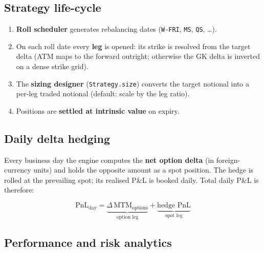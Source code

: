 \documentclass[11pt, a4paper]{article}
\theoremstyle{defstyle}
\newcommand{\code}[1]{\texttt{#1}}
\begin{document}
\subsection{Strategy life-cycle}

\begin{enumerate}
    \item \textbf{Roll scheduler} generates rebalancing dates
          (\code{W-FRI}, \code{MS}, \code{QS}, \ldots).
    \item On each roll date every \textbf{leg} is opened: its strike is resolved from
          the target delta (ATM maps to the forward outright; otherwise the GK delta is
          inverted on a dense strike grid).
    \item The \textbf{sizing designer} (\code{Strategy.size}) converts the target notional
          into a per-leg traded notional (default: scale by the leg ratio).
    \item Positions are \textbf{settled at intrinsic value} on expiry.
\end{enumerate}

\subsection{Daily delta hedging}

Every business day the engine computes the \textbf{net option delta} (in
foreign-currency units) and holds the opposite amount as a spot position.
The hedge is rolled at the prevailing spot; its realised P\&L is booked daily.
Total daily P\&L is therefore:

\begin{equation}
    \mathrm{PnL}_{\mathrm{day}}
    =
    \underbrace{\Delta\,\mathrm{MTM}_{\mathrm{options}}}_{\text{option leg}}
    +
    \underbrace{\text{hedge PnL}}_{\text{spot leg}}
\end{equation}

\subsection{Performance and risk analytics}
\end{document}
